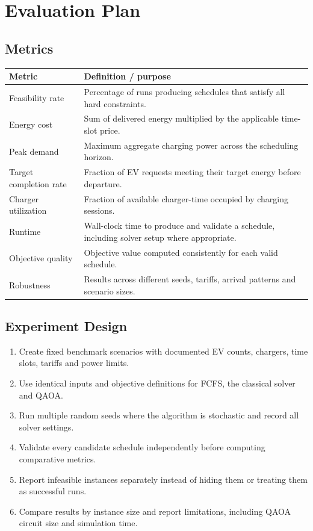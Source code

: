\documentclass[11pt,a4paper]{article}
\begin{document}
\section{Evaluation Plan}

\subsection{Metrics}

\begin{tabularx}{\textwidth}{p{3.2cm}X}
\toprule
\textbf{Metric} & \textbf{Definition / purpose} \\
\midrule
Feasibility rate & Percentage of runs producing schedules that satisfy all hard constraints. \\
Energy cost & Sum of delivered energy multiplied by the applicable time-slot price. \\
Peak demand & Maximum aggregate charging power across the scheduling horizon. \\
Target completion rate & Fraction of EV requests meeting their target energy before departure. \\
Charger utilization & Fraction of available charger-time occupied by charging sessions. \\
Runtime & Wall-clock time to produce and validate a schedule, including solver setup where appropriate. \\
Objective quality & Objective value computed consistently for each valid schedule. \\
Robustness & Results across different seeds, tariffs, arrival patterns and scenario sizes. \\
\bottomrule
\end{tabularx}

\subsection{Experiment Design}

\begin{enumerate}
  \item Create fixed benchmark scenarios with documented EV counts, chargers, time slots, tariffs and power limits.
  \item Use identical inputs and objective definitions for FCFS, the classical solver and QAOA.
  \item Run multiple random seeds where the algorithm is stochastic and record all solver settings.
  \item Validate every candidate schedule independently before computing comparative metrics.
  \item Report infeasible instances separately instead of hiding them or treating them as successful runs.
  \item Compare results by instance size and report limitations, including QAOA circuit size and simulation time.
\end{enumerate}
\end{document}
